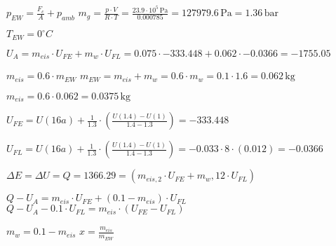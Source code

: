 \( p_{EW} = \frac{F_c}{A} + p_{amb} \)  
\( m_g = \frac{p \cdot V}{R \cdot T} = \frac{23.9 \cdot 10^5 \, \text{Pa}}{0.000785} = 127979.6 \, \text{Pa} = 1.36 \, \text{bar} \)  

\( T_{EW} = 0^\circ C \)  

\( U_A = m_{eis} \cdot U_{FE} + m_w \cdot U_{FL} = 0.075 \cdot -333.448 + 0.062 \cdot -0.0366 = -1755.05 \)  

\( m_{eis} = 0.6 \cdot m_{EW} \)  
\( m_{EW} = m_{eis} + m_w = 0.6 \cdot m_w = 0.1 \cdot 1.6 = 0.062 \, \text{kg} \)  

\( m_{eis} = 0.6 \cdot 0.062 = 0.0375 \, \text{kg} \)  

\( U_{FE} = U(16a) + \frac{1}{1.3} \cdot \left( \frac{U(1.4) - U(1)}{1.4 - 1.3} \right) = -333.448 \)  

\( U_{FL} = U(16a) + \frac{1}{1.3} \cdot \left( \frac{U(1.4) - U(1)}{1.4 - 1.3} \right) = -0.033 \cdot 8 \cdot (0.012) = -0.0366 \)  

\( \Delta E = \Delta U = Q = 1366.29 = (m_{eis,2} \cdot U_{FE} + m_w,12 \cdot U_{FL}) \)  

\( Q - U_A = m_{eis} \cdot U_{FE} + (0.1 - m_{eis}) \cdot U_{FL} \)  
\( Q - U_A - 0.1 \cdot U_{FL} = m_{eis} \cdot (U_{FE} - U_{FL}) \)  

\( m_w = 0.1 - m_{eis} \)  
\( x = \frac{m_{eis}}{m_{EW}} \)